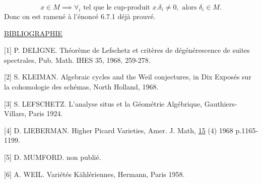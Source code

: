 \begin{equation*}
x \in M \implies \forall_i \text{ tel que le cup-produit } x.\delta_i \neq 0, \text{ alors } \delta_i \in M.
\end{equation*}
Donc on est ramené à l'énoncé 6.7.1 déjà prouvé.


\underline{BIBLIOGRAPHIE}

[1] P. DELIGNE. Théorème de Lefschetz et critères de dégénérescence de suites spectrales, Pub. Math. IHES 35, 1968, 259-278.

[2] S. KLEIMAN. Algebraic cycles and the Weil conjectures, in Dix Exposés sur la cohomologie des schémas, North Holland, 1968.

[3] S. LEFSCHETZ. L'analyse situs et la Géométrie Algébrique, Gauthiers-Villars, Paris 1924.

[4] D. LIEBERMAN. Higher Picard Varieties, Amer. J. Math, \underline{15} (4) 1968 p.1165-1199.

[5] D. MUMFORD. non publié.

[6] A. WEIL. Variétés Kählériennes, Hermann, Paris 1958.

